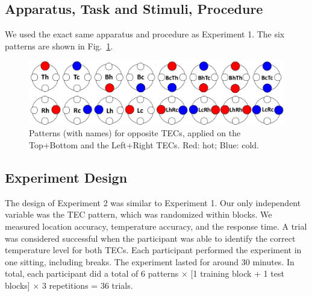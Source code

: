 \documentclass[preprint,12pt]{elsarticle}
\begin{document}
\subsection{Apparatus, Task and Stimuli, Procedure}
We used the exact same apparatus and procedure as Experiment 1. The six patterns are shown in Fig.~\ref{fig:12}.

\begin{figure}[tp]
  \centering
  \includegraphics[width=0.9\columnwidth]{img/fig12.pdf}
  \caption{Patterns (with names) for opposite TECs, applied on the Top+Bottom and the Left+Right TECs. Red: hot; Blue: cold.}
  \label{fig:12}
\end{figure}

\subsection{Experiment Design}
The design of Experiment 2 was similar to Experiment 1. Our only independent variable was the TEC pattern, which was randomized within blocks. We measured location accuracy, temperature accuracy, and the response time. A trial was considered successful when the participant was able to identify the correct temperature level for both TECs. Each participant performed the experiment in one sitting, including breaks. The experiment lasted for around 30 minutes. In total, each participant did a total of 6 patterns $\times$ [1 training block + 1 test blocks] $\times$ 3 repetitions = 36 trials.
\end{document}
